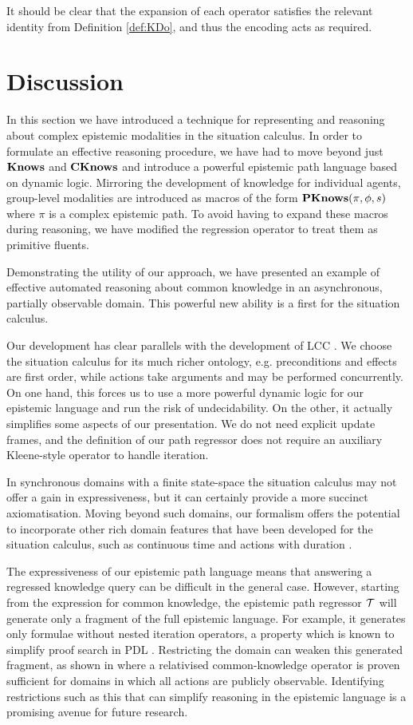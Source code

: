 It should be clear that the expansion of each operator satisfies the
relevant identity from Definition \ref{def:KDo}, and thus the encoding
acts as required.


\section{Discussion\label{sub:CEM-Discussion}}

In this section we have introduced a technique for representing and
reasoning about complex epistemic modalities in the situation calculus.
In order to formulate an effective reasoning procedure, we have had
to move beyond just $\mathbf{Knows}$ and $\mathbf{CKnows}$ and introduce a powerful
epistemic path language based on dynamic logic. Mirroring the development
of knowledge for individual agents, group-level modalities are introduced
as macros of the form $\mathbf{PKnows}(\pi,\phi,s)$ where $\pi$ is a complex
epistemic path. To avoid having to expand these macros during reasoning,
we have modified the regression operator to treat them as primitive
fluents.

Demonstrating the utility of our approach, we have presented an example
of effective automated reasoning about common knowledge in an asynchronous,
partially observable domain. This powerful new ability is a first
for the situation calculus.

Our development has clear parallels with the development of LCC \citep{vanBenthem06lcc}.
We choose the situation calculus for its much richer ontology, e.g.
preconditions and effects are first order, while actions take arguments
and may be performed concurrently. On one hand, this forces us to
use a more powerful dynamic logic for our epistemic language and run
the risk of undecidability. On the other, it actually simplifies some
aspects of our presentation. We do not need explicit update frames,
and the definition of our path regressor does not require an auxiliary
Kleene-style operator to handle iteration.

In synchronous domains with a finite state-space the situation calculus
may not offer a gain in expressiveness, but it can certainly provide
a more succinct axiomatisation. Moving beyond such domains, our formalism
offers the potential to incorporate other rich domain features that
have been developed for the situation calculus, such as continuous
time and actions with duration \citep{reiter96sc_nat_conc}.

The expressiveness of our epistemic path language means that answering
a regressed knowledge query can be difficult in the general case.
However, starting from the expression for common knowledge, the epistemic
path regressor $\mathcal{T}$ will generate only a fragment of the full epistemic
language. For example, it generates only formulae without nested iteration
operators, a property which is known to simplify proof search in PDL
\citep{abate07twb_pdl}. Restricting the domain can weaken this generated
fragment, as shown in \citep{vanBenthem06lcc} where a relativised
common-knowledge operator is proven sufficient for domains in which
all actions are publicly observable. Identifying restrictions such
as this that can simplify reasoning in the epistemic language is a
promising avenue for future research.

